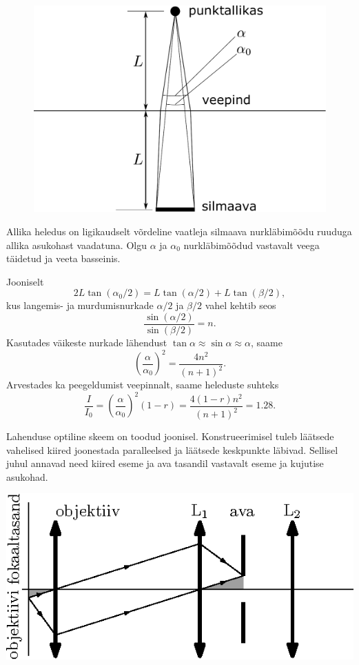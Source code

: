 \documentclass[10pt, twoside]{article}
\begin{document}
{
\solu
\begin{figure}
	\begin{center}
		\includegraphics[width=0.95\linewidth]{2008-v3g-05-lah}
	\end{center}
\end{figure}
Allika heledus on ligikaudselt võrdeline vaatleja silmaava nurkläbimõõdu ruuduga allika asukohast vaadatuna. Olgu $\alpha$ ja $\alpha_0$ nurkläbimõõdud vastavalt veega täidetud ja veeta basseinis.

Jooniselt
\[
2L\tan (\alpha_0 /2) = L\tan (\alpha /2) + L\tan (\beta /2),
\]
kus langemis- ja murdumisnurkade $\alpha /2$ ja $\beta /2$ vahel kehtib seos
\[
\frac{\sin(\alpha/2)}{\sin(\beta/2)} = n.
\]
Kasutades väikeste nurkade lähendust $\tan\alpha\approx\sin\alpha\approx\alpha$, saame 
\[
\left(\frac{\alpha}{\alpha_0}\right)^2 = \frac{4n^2}{(n+1)^2}.
\]
Arvestades ka peegeldumist veepinnalt, saame heleduste suhteks
\[
\frac{I}{I_{0}}=\left(\frac{\alpha}{\alpha_0}\right)^2(1-r) = \frac{4(1-r) n^{2}}{(n+1)^{2}}=\num{1,28}.
\]
\probend
\bigskip


\solu
Lahenduse optiline skeem on toodud joonisel. Konstrueerimisel tuleb
läätsede vahelised kiired joonestada paralleelsed ja läätsede keskpunkte läbivad.
Sellisel juhul annavad need kiired eseme ja ava tasandil vastavalt eseme ja kujutise
asukohad.

\begin{center}
	\includegraphics[width=0.8\linewidth]{2009-v3g-07-G_konfokaalne_mikroskoop_lah.eps}
\end{center}

}
\end{document}
